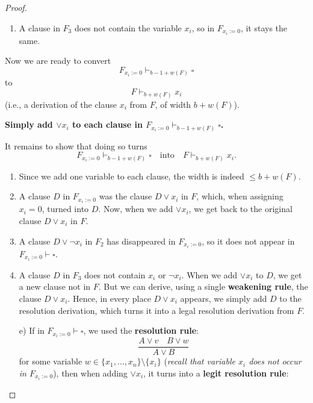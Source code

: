 \begin{proof}
\begin{enumerate}
    \item A clause in $F_3$ does not contain the variable $x_i$,  
    so in $F_{x_i := 0}$, it stays the same.
\end{enumerate}

Now we are ready to convert  
\[
F_{x_i := 0} \vdash_{b - 1 + w(F)} \square
\]  
to  
\[
F \vdash_{b + w(F)} x_i
\]  
(i.e., a derivation of the clause $x_i$ from $F$, of width $b + w(F)$).

\begin{center}
        \textbf{Simply add $\lor x_i$ to each clause in $F_{x_i := 0} \vdash_{b - 1 + w(F)} \square$.}
\end{center}
 

It remains to show that doing so turns  
\[
F_{x_i := 0} \vdash_{b - 1 + w(F)} \square \quad \text{into} \quad F \vdash_{b + w(F)} x_i.
\]

\begin{enumerate}
    \item Since we add one variable to each clause, the width is indeed $\leq b + w(F)$.
    
    \item A clause $D$ in $F_{x_i := 0}$ was the clause $D \lor x_i$ in $F$,  
    which, when assigning $x_i = 0$, turned into $D$.  
    Now, when we add $\lor x_i$, we get back to the original clause $D \lor x_i$ in $F$.

    \item A clause $D \lor \neg x_i$ in $F_2$ has disappeared in $F_{x_i := 0}$,  
    so it does not appear in $F_{x_i := 0} \vdash \square$.

    \item A clause $D$ in $F_3$ does not contain $x_i$ or $\neg x_i$.  
    When we add $\lor x_i$ to $D$, we get a new clause not in $F$.  
    But we can derive, using a single \textbf{weakening rule}, the clause $D \lor x_i$.  
    Hence, in every place $D \lor x_i$ appears, we simply add $D$ to the resolution derivation,  
    which turns it into a legal resolution derivation from $F$.
\end{enumerate}

\textbf{ }

\begin{enumerate}
    \item[e)] If in $F_{x_i := 0} \vdash \square$, we used the \textbf{resolution rule}:
    \[
    \frac{A \lor v \quad B \lor w}{A \lor B}
    \]
    for some variable $w \in \{x_1, \dots, x_n\} \setminus \{x_i\}$  
    (\textit{recall that variable $x_i$ does not occur in $F_{x_i := 0}$}),  
    then when adding $\lor x_i$, it turns into a \textbf{legit resolution rule}:


\end{enumerate}
\end{proof}

